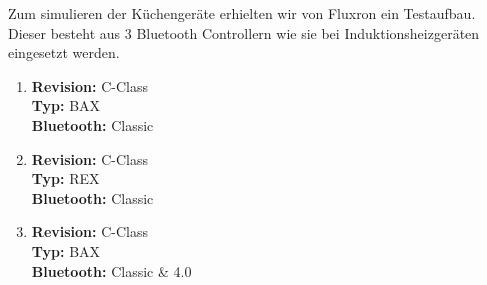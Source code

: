 Zum simulieren der Küchengeräte erhielten wir von Fluxron ein Testaufbau. Dieser besteht aus 3 Bluetooth Controllern wie sie bei Induktionsheizgeräten eingesetzt werden.

\begin{enumerate}[leftmargin=9.7cm]
\item \textbf{Revision:} C-Class\\ \textbf{Typ:} BAX\\ \textbf{Bluetooth:} Classic
\item \textbf{Revision:} C-Class\\ \textbf{Typ:} REX\\ \textbf{Bluetooth:} Classic
\item \textbf{Revision:} C-Class\\ \textbf{Typ:} BAX\\ \textbf{Bluetooth:} Classic \& 4.0
\end{enumerate}
